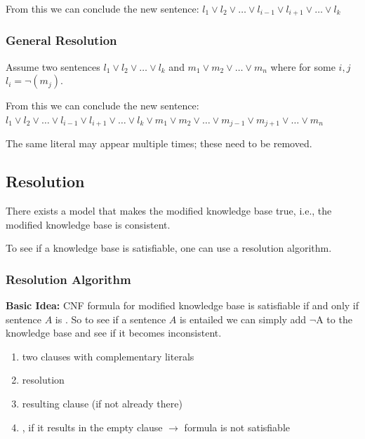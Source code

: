 \documentclass[
../EiKI_Summary.tex,
]
{subfiles}
\begin{document}
From this we can conclude the new sentence: $l_1 \lor l_2 \lor \dots \lor l_{i-1} \lor l_{i+1} \lor \dots \lor l_k$

\subsubsection{General Resolution}
Assume two sentences $l_1 \lor l_2 \lor \dots \lor l_k$ and $m_1 \lor m_2 \lor \dots \lor m_n$ where for some $i,j$ $l_i = \neg(m_j)$. 

From this we can conclude the new sentence: $l_1 \lor l_2 \lor \dots \lor l_{i-1} \lor l_{i+1} \lor \dots \lor l_k \lor m_1 \lor m_2 \lor \dots \lor m_{j-1} \lor m_{j+1} \lor \dots \lor m_n$ 

The same literal may appear multiple times; these need to be removed.

\subsection{Resolution}
\begin{defbox}
    [Satisfiable]
    There exists a model that makes the modified knowledge base true, i.e., the modified knowledge base is consistent.
\end{defbox}

To see if a knowledge base is satisfiable, one can use a resolution algorithm.

\subsubsection{Resolution Algorithm}
\textbf{Basic Idea:}
CNF formula for modified knowledge base is satisfiable if and only if sentence $A$ is .
So to see if a sentence $A$ is entailed we can simply add $\neg$A to the knowledge base and see if it becomes inconsistent.

\begin{enumerate}
    \item {} two clauses with complementary literals
    \item {} resolution
    \item {} resulting clause (if not already there)
    \item {}, if it results in the empty clause $\rightarrow$ formula is not satisfiable 
\end{enumerate}
\end{document}
